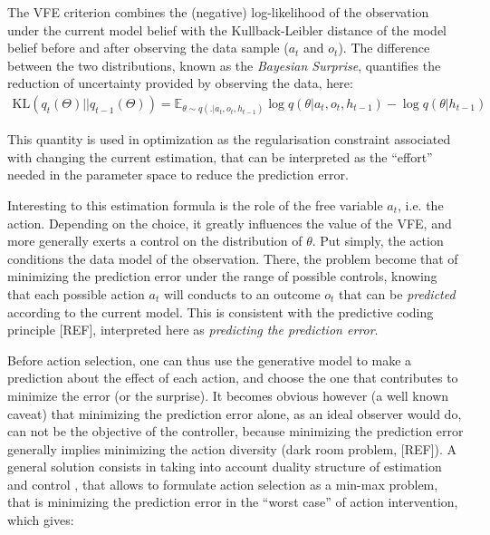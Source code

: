 \documentclass[10pt,letterpaper]{article}
\begin{document}
The VFE criterion combines the (negative) log-likelihood of the observation under the current model belief with the Kullback-Leibler distance of the model belief before and after observing the data sample ($a_t$ and $o_t$). The difference between the two distributions, known as the \emph{Bayesian Surprise}, quantifies the reduction of uncertainty provided by observing the data, here:
\begin{align}\label{eq:BS}
\text{KL}(q_t(\Theta)||q_{t-1}(\Theta)) =\mathbb{E}_{\theta \sim q(.|a_t, o_t, h_{t-1})} \log q(\theta|a_t, o_t, h_{t-1}) - \log q(\theta|h_{t-1})    
 \end{align}

This quantity is used in optimization as the regularisation constraint associated with changing the current estimation, that can be interpreted as the ``effort'' needed in the parameter space to reduce the prediction error. 

Interesting to this estimation formula is the role of the free variable $a_t$, i.e. the action. Depending on the choice, it greatly influences the value of the VFE, and more generally exerts a control on the distribution of $\theta$. Put simply, the action conditions the data model of the observation. %
There, the problem become that of minimizing the prediction error under the range of possible controls, knowing that each possible action $a_t$ will conducts to an outcome $o_t$ that can be \emph{predicted} according to the current model. 
This is consistent with the predictive coding principle [REF], interpreted here as \emph{predicting the prediction error}.

Before action selection, one can thus use the generative model to make a prediction about the effect of each action, and choose the one that contributes to minimize the error (or the surprise). 
It becomes obvious however (a well known caveat) that minimizing the prediction error alone, as an ideal observer would do, can not be the objective of the controller, because minimizing the prediction error generally implies minimizing the action diversity (dark room problem, [REF]).
A general solution consists in taking into account duality structure of estimation and control \cite{todorov2001optimal}, that allows to formulate action selection as a min-max problem, that is minimizing the prediction error in the ``worst case'' of action intervention, which gives:
\end{document}
